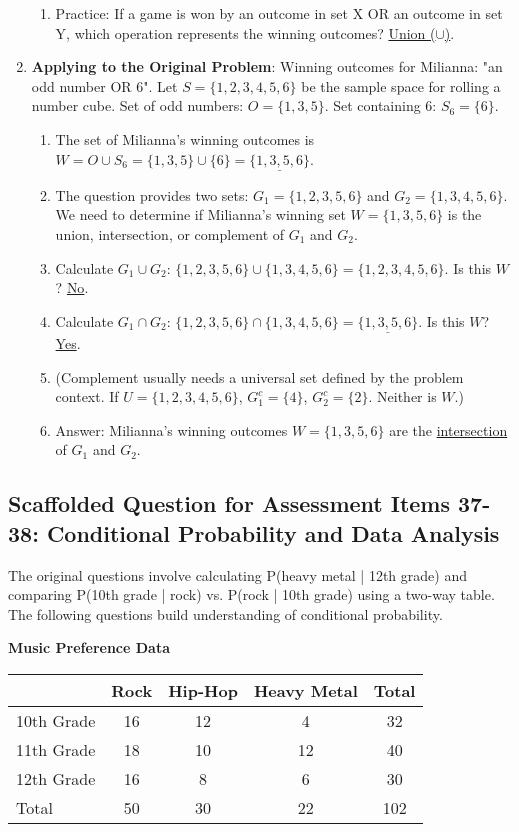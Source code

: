 \documentclass[12pt]{article}
\begin{document}
\begin{enumerate}[label=36.\arabic*]
\begin{enumerate}[label=\alph*)]
        \item Practice: If a game is won by an outcome in set X OR an outcome in set Y, which operation represents the winning outcomes? \underline{Union (\(\cup\))}.
    \end{enumerate}
    \item \textbf{Applying to the Original Problem}:
    Winning outcomes for Milianna: "an odd number OR 6".
    Let \(S = \{1, 2, 3, 4, 5, 6\}\) be the sample space for rolling a number cube.
    Set of odd numbers: \(O = \{1, 3, 5\}\).
    Set containing 6: \(S_6 = \{6\}\).
    \begin{enumerate}[label=\alph*)]
        \item The set of Milianna's winning outcomes is \( W = O \cup S_6 = \{1, 3, 5\} \cup \{6\} = \underline{\{1, 3, 5, 6\}} \).
        \item The question provides two sets: \( G_1 = \{1, 2, 3, 5, 6\} \) and \( G_2 = \{1, 3, 4, 5, 6\} \).
        We need to determine if Milianna's winning set \(W = \{1, 3, 5, 6\}\) is the union, intersection, or complement of \(G_1\) and \(G_2\).
        \item Calculate \(G_1 \cup G_2\): \(\{1, 2, 3, 5, 6\} \cup \{1, 3, 4, 5, 6\} = \{1, 2, 3, 4, 5, 6\}\). Is this \(W\)? \underline{No}.
        \item Calculate \(G_1 \cap G_2\): \(\{1, 2, 3, 5, 6\} \cap \{1, 3, 4, 5, 6\} = \underline{\{1, 3, 5, 6\}}\). Is this \(W\)? \underline{Yes}.
        \item (Complement usually needs a universal set defined by the problem context. If \(U = \{1,2,3,4,5,6\}\), \(G_1^c = \{4\}\), \(G_2^c = \{2\}\). Neither is \(W\).)
        \item Answer: Milianna's winning outcomes \(W=\{1,3,5,6\}\) are the \underline{intersection} of \(G_1\) and \(G_2\).
    \end{enumerate}
\end{enumerate}

\subsection*{Scaffolded Question for Assessment Items 37-38: Conditional Probability and Data Analysis}
The original questions involve calculating P(heavy metal | 12th grade) and comparing P(10th grade | rock) vs. P(rock | 10th grade) using a two-way table. The following questions build understanding of conditional probability.

\begin{center}
\textbf{Music Preference Data}
\begin{tabular}{l|ccc|c}
    & Rock & Hip-Hop & Heavy Metal & Total \\
    \hline
    10th Grade & 16 & 12 & 4 & 32 \\
    11th Grade & 18 & 10 & 12 & 40 \\
    12th Grade & 16 & 8 & 6 & 30 \\
    \hline
    Total & 50 & 30 & 22 & 102 \\
\end{tabular}
\end{center}
\end{document}
